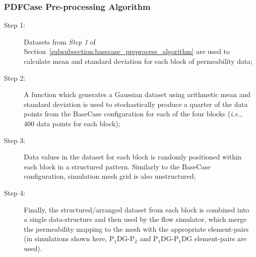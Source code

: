 \documentclass[preprint,12pt]{elsarticle}
\newcommand{\PN}[2][error]{P$_{#1}$DG-P$_{#2}$}
\newcommand{\PNDG}[2][error]{P$_{#1}$DG-P$_{#2}$DG}
\newcommand{\ie}{{\it i.e., }}
\begin{document}
\subsubsection{PDFCase Pre-processing Algorithm}\label{subsubsection:pdfcase_preprocess_algorithm}
\begin{description}
  \item[Step 1:] Datasets from {\it Step 1} of Section~\ref{subsubsection:basecase_preprocess_algorithm} are used to calculate mean and standard deviation for each block of permeability data;
  \item[Step 2:] A function which generates a Gaussian dataset using arithmetic mean and standard deviation is used to stochastically produce a quarter of the data points from the BaseCase configuration for each of the four blocks (\ie $400$ data points for each block);
  \item[Step 3:] Data values in the dataset for each block is randomly positioned within each block in a structured pattern. Similarly to the BaseCase configuration, simulation mesh grid is also unstructured;
  \item[Step 4:] Finally, the structured/arranged dataset from each block is combined into a single data-structure and then used by the flow simulator, which merge the permeability mapping to the mesh with the appropriate element-pairs (in simulations shown here, \PN[1]{2} and \PNDG[1]{1} element-pairs are used).
\end{description}
\end{document}
